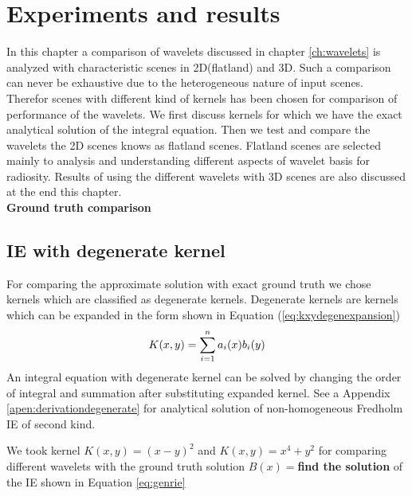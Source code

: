 \chapter{\label{ch:experimentandresult}Experiments and results}
In this chapter a comparison of wavelets discussed in chapter  \ref{ch:wavelets} is analyzed with characteristic scenes in 2D(flatland) and 3D. Such a comparison can never be exhaustive due to the heterogeneous nature of input scenes. Therefor scenes with different kind of kernels has been chosen for comparison of performance of the wavelets. We first discuss kernels for which we have the exact analytical solution of the integral equation. Then we test and compare the wavelets the 2D scenes knows as flatland scenes. Flatland scenes are selected mainly to analysis and understanding different aspects of wavelet basis for radiosity. Results of using the different wavelets with 3D scenes are also discussed at the end this chapter. \\

{\bf Ground truth comparison}\\
\section{IE with degenerate kernel}
For comparing the approximate solution with exact ground truth we chose kernels which are classified as degenerate kernels. Degenerate kernels are kernels which can be expanded in the form shown in Equation (\ref{eq:kxydegenexpansion})
\begin{equation} \label{eq:kxydegen}
K(x,y) = \sum\limits_{i=1}^na_i(x)b_i(y) \\ 
\end{equation}
An integral equation with degenerate kernel can be solved by changing the order of integral and summation after substituting expanded kernel. See a
Appendix \ref{apen:derivationdegenerate} for analytical solution of non-homogeneous Fredholm IE of second kind. 

We took kernel $K(x,y)=(x-y)^2$ and $K(x,y)=x^4+y^2$ for comparing different wavelets with the ground truth solution $B(x)=${\bf find the solution} of the IE shown in Equation \ref{eq:genrie}


